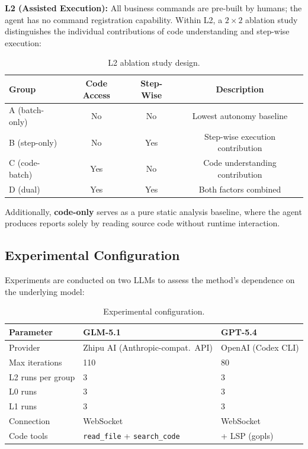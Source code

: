 \documentclass[sigconf,nonacm]{acmart}
\begin{document}
\textbf{L2 (Assisted Execution):} All business commands are pre-built by humans; the agent has no command registration capability. Within L2, a $2\times2$ ablation study distinguishes the individual contributions of code understanding and step-wise execution:

\begin{table}[t]
\caption{L2 ablation study design.}
\label{tab:ablation-design}
\small
\begin{tabular}{lccc}
\toprule
Group & Code Access & Step-Wise & Description \\
\midrule
A (batch-only) & No & No & Lowest autonomy baseline \\
B (step-only) & No & Yes & Step-wise execution contribution \\
C (code-batch) & Yes & No & Code understanding contribution \\
D (dual) & Yes & Yes & Both factors combined \\
\bottomrule
\end{tabular}
\end{table}

Additionally, \textbf{code-only} serves as a pure static analysis baseline, where the agent produces reports solely by reading source code without runtime interaction.

\subsection{Experimental Configuration}

Experiments are conducted on two LLMs to assess the method's dependence on the underlying model:

\begin{table}[t]
\caption{Experimental configuration.}
\label{tab:config}
\small
\begin{tabular}{lll}
\toprule
Parameter & GLM-5.1 & GPT-5.4 \\
\midrule
Provider & Zhipu AI (Anthropic-compat.\ API) & OpenAI (Codex CLI) \\
Max iterations & 110 & 80 \\
L2 runs per group & 3 & 3 \\
L0 runs & 3 & 3 \\
L1 runs & 3 & 3 \\
Connection & WebSocket & WebSocket \\
Code tools & \texttt{read\_file} + \texttt{search\_code} & + LSP (gopls) \\
\bottomrule
\end{tabular}
\end{table}
\end{document}
